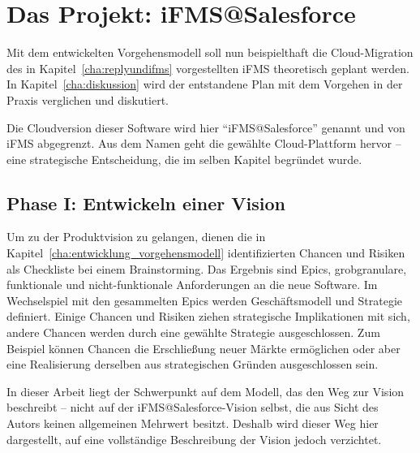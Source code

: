 \section{Das Projekt: iFMS@Salesforce}
\label{cha:result}
\begin{comment}
In Kapitel „Forschungsergebnisse“ stellen Sie die Ergebnisse ihrer Arbeit dar.
An dieser Stelle nehmen Sie noch keine Interpretation oder Erläuterung der 
Ergebnisse vor, sondern beschreiben rein deskriptiv ihre Befunde. Eine 
Auswertung findet im nachfolgenden Kapitel statt.
\end{comment}
Mit dem entwickelten 
Vorgehensmodell soll nun 
beispielthaft die Cloud-Migration 
des in Kapitel~\ref{cha:replyundifms} vorgestellten iFMS theoretisch geplant 
werden. In Kapitel~\ref{cha:diskussion} wird der entstandene Plan mit dem 
Vorgehen in der Praxis verglichen und diskutiert.

Die Cloudversion dieser Software wird hier "`iFMS@Salesforce"' genannt und von 
iFMS abgegrenzt. Aus dem Namen geht die gewählte Cloud-Plattform hervor -- eine 
strategische Entscheidung, die im selben 
Kapitel begründet wurde.

\subsection{Phase I: Entwickeln einer Vision}
Um zu der Produktvision zu gelangen, dienen die in 
Kapitel~\ref{cha:entwicklung_vorgehensmodell} identifizierten Chancen und 
Risiken als Checkliste bei einem Brainstorming. Das Ergebnis sind Epics, 
grobgranulare, funktionale und nicht-funktionale Anforderungen an die neue 
Software. 
Im Wechselspiel mit den gesammelten Epics werden Geschäftsmodell und Strategie 
definiert. Einige Chancen und Risiken ziehen strategische Implikationen mit 
sich, andere Chancen werden durch eine gewählte Strategie ausgeschlossen. Zum 
Beispiel können Chancen die Erschließung neuer Märkte ermöglichen oder aber 
eine Realisierung derselben aus strategischen Gründen ausgeschlossen sein. 

In dieser Arbeit liegt der Schwerpunkt auf dem Modell, das den Weg zur Vision 
beschreibt -- nicht auf der iFMS@Salesforce-Vision selbst, die aus Sicht des 
Autors  keinen allgemeinen Mehrwert besitzt. Deshalb wird dieser Weg 
hier dargestellt, auf eine vollständige Beschreibung der Vision jedoch 
verzichtet. 
